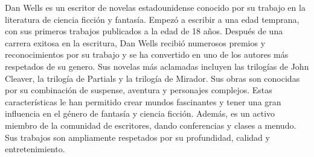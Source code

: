 
Dan Wells es un escritor de novelas estadounidense conocido por su trabajo en la literatura de ciencia ficción y fantasía. Empezó a escribir a una edad temprana, con sus primeros trabajos publicados a la edad de 18 años. Después de una carrera exitosa en la escritura, Dan Wells recibió numerosos premios y reconocimientos por su trabajo y se ha convertido en uno de los autores más respetados de su genero. Sus novelas más aclamadas incluyen las trilogías de John Cleaver, la trilogía de Partials y la trilogía de Mirador. Sus obras son conocidas por su combinación de suspense, aventura y personajes complejos. Estas características le han permitido crear mundos fascinantes y tener una gran influencia en el género de fantasía y ciencia ficción. Además, es un activo miembro de la comunidad de escritores, dando conferencias y clases a menudo. Sus trabajos son ampliamente respetados por su profundidad, calidad y entretenimiento.